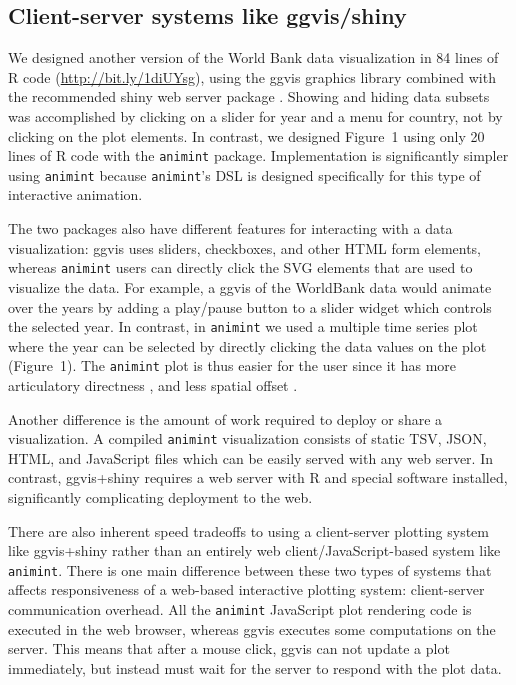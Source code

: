 \documentclass[journal]{vgtc}\usepackage[]{graphicx}\usepackage[]{color}
\begin{document}
\subsection{Client-server systems like ggvis/shiny}

We designed another version of the World Bank data visualization in 84
lines of R code (\url{http://bit.ly/1diUYsg}), using the ggvis
graphics library combined with the recommended shiny web server
package \citep{shiny, ggvis}. Showing and hiding data subsets was
accomplished by clicking on a slider for year and a menu for country,
not by clicking on the plot elements. In contrast, we designed
Figure~1 using only 20 lines of R code with the \texttt{animint} package.
Implementation is significantly simpler using \texttt{animint}
because \texttt{animint}'s DSL is designed specifically for this type of
interactive animation.

The two packages also have different features for interacting with a
data visualization: ggvis uses sliders, checkboxes, and other HTML
form elements, whereas \texttt{animint} users can directly click the SVG
elements that are used to visualize the data. For example, a ggvis of
the WorldBank data would animate over the years by adding a play/pause
button to a slider widget which controls the selected year. In
contrast, in \texttt{animint} we used a multiple time series plot where the
year can be selected by directly clicking the data values on the plot
(Figure~1). The \texttt{animint} plot is thus easier for the user since it has
more articulatory directness \citep{Hutchins:1985}, and less spatial
offset \citep{instrumental-interaction}.

Another difference is the amount of work required to deploy or share a
visualization. A compiled \texttt{animint} visualization consists of static
TSV, JSON, HTML, and JavaScript files which can be easily served with
any web server. In contrast, ggvis+shiny requires a web server with R
and special software installed, significantly complicating
deployment to the web.

There are also inherent speed tradeoffs to using a client-server
plotting system like ggvis+shiny rather than an entirely web
client/JavaScript-based system like \texttt{animint}. There is one main
difference between these two types of systems that affects
responsiveness of a web-based interactive plotting system:
client-server communication overhead. All the \texttt{animint}
JavaScript plot rendering code is executed in the web browser, whereas
ggvis executes some computations on the server. This means that after
a mouse click, ggvis can not update a plot immediately, but instead
must wait for the server to respond with the plot data.
\end{document}
